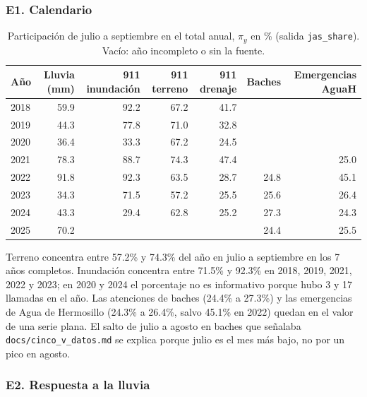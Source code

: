 \documentclass[11pt]{article}
\newcommand{\cod}[1]{\nolinkurl{#1}}
\begin{document}
\subsubsection*{E1. Calendario}

\begin{table}[!htbp]
  \centering
  \small
  \caption{Participación de julio a septiembre en el total anual, $\pi_y$ en \% (salida \cod{jas_share}). Vacío: año incompleto o sin la fuente.}
  \label{tab:e1}
  \begin{tabular}{lrrrrrr}
    \toprule
    Año & Lluvia (mm) & 911 inundación & 911 terreno & 911 drenaje & Baches & Emergencias AguaH \\
    \midrule
    2018 & 59.9 & 92.2 & 67.2 & 41.7 & & \\
    2019 & 44.3 & 77.8 & 71.0 & 32.8 & & \\
    2020 & 36.4 & 33.3 & 67.2 & 24.5 & & \\
    2021 & 78.3 & 88.7 & 74.3 & 47.4 & & 25.0 \\
    2022 & 91.8 & 92.3 & 63.5 & 28.7 & 24.8 & 45.1 \\
    2023 & 34.3 & 71.5 & 57.2 & 25.5 & 25.6 & 26.4 \\
    2024 & 43.3 & 29.4 & 62.8 & 25.2 & 27.3 & 24.3 \\
    2025 & 70.2 & & & & 24.4 & 25.5 \\
    \bottomrule
  \end{tabular}
\end{table}

Terreno concentra entre 57.2\% y 74.3\% del año en julio a septiembre en los 7 años completos. Inundación concentra entre 71.5\% y 92.3\% en 2018, 2019, 2021, 2022 y 2023; en 2020 y 2024 el porcentaje no es informativo porque hubo 3 y 17 llamadas en el año. Las atenciones de baches (24.4\% a 27.3\%) y las emergencias de Agua de Hermosillo (24.3\% a 26.4\%, salvo 45.1\% en 2022) quedan en el valor de una serie plana. El salto de julio a agosto en baches que señalaba \cod{docs/cinco_v_datos.md} se explica porque julio es el mes más bajo, no por un pico en agosto.

\FloatBarrier
\subsubsection*{E2. Respuesta a la lluvia}
\end{document}
